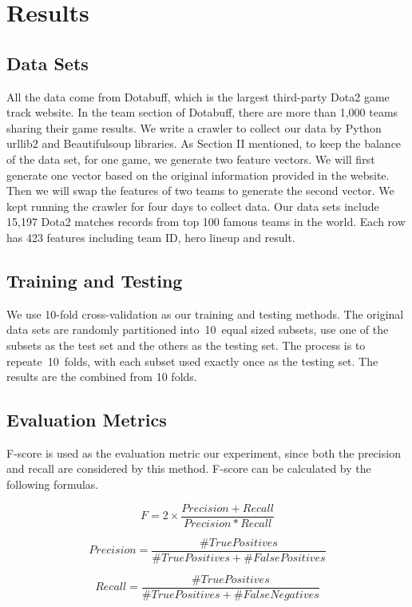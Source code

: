 \documentclass{article}
\begin{document}
\section{Results}
\subsection{Data Sets}
All the data come from Dotabuff, which is the largest third-party Dota2 game track website. In the team section of Dotabuff, there are more than 1,000 teams sharing their game results. We write a crawler to collect our data by Python urllib2 and Beautifulsoup libraries. As Section II mentioned, to keep the balance of the data set, for one game, we generate two feature vectors. We will first generate one vector based on the original information provided in the website. Then we will swap the features of two teams to generate the second vector. We kept running the crawler for four days to collect data.
Our data sets include 15,197 Dota2 matches records from top 100 famous teams in the world. Each row has 423 features including team ID, hero lineup and result.

\subsection{Training and Testing}
We use 10-fold cross-validation as our training and testing methods. The original data sets are randomly partitioned into 10 equal sized subsets, use one of the subsets as the test set and the others as the testing set. The process is to repeate 10 folds, with each subset used exactly once as the testing set. The results are the combined from 10 folds.

\subsection{Evaluation Metrics}
F-score is used as the evaluation metric our experiment, since both the precision and recall are considered by this method. F-score can be calculated by the following formulas.

\begin{equation}
F=2\times\frac{Precision+Recall}{Precision*Recall}
\end{equation}

\begin{equation}
Precision = \frac{\#TruePositives}{\#TruePositives+\#FalsePositives}
\end{equation}

\begin{equation}
Recall = \frac{\#TruePositives}{\#TruePositives+\#FalseNegatives}
\end{equation}
\end{document}
